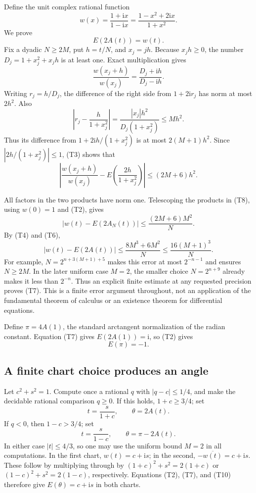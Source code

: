 Define the unit complex rational function
\[
 w(x)=\frac{1+\mathrm ix}{1-\mathrm ix}
     =\frac{1-x^2+2\mathrm ix}{1+x^2}.
\]
We prove
\[
                     E(2A(t))=w(t).                        \tag{T7}
\]
Fix a dyadic $N\geq2M$, put $h=t/N$, and $x_j=jh$.
Because $x_jh\geq0$, the number
$D_j=1+x_j^2+x_jh$ is at least one.  Exact multiplication gives
\[
 \frac{w(x_j+h)}{w(x_j)}
       =\frac{D_j+\mathrm ih}{D_j-\mathrm ih}.
\]
Writing $r_j=h/D_j$, the difference of the right side from
$1+2\mathrm ir_j$ has norm at most $2h^2$.
Also
\[
 \left|r_j-\frac{h}{1+x_j^2}\right|
 =\frac{|x_j|h^2}{D_j(1+x_j^2)}\leq Mh^2.
\]
Thus its difference from $1+2\mathrm i h/(1+x_j^2)$ is at most
$2(M+1)h^2$.  Since $|2h/(1+x_j^2)|\leq1$, (T3) shows that
\[
 \left|\frac{w(x_j+h)}{w(x_j)}
       -E\!\left(\frac{2h}{1+x_j^2}\right)\right|
 \leq(2M+6)h^2.                                            \tag{T8}
\]

All factors in the two products have norm one.  Telescoping the products
in (T8), using $w(0)=1$ and (T2), gives
\[
 |w(t)-E(2A_N(t))|
 \leq \frac{(2M+6)M^2}{N}.
\]
By (T4) and (T6),
\[
 |w(t)-E(2A(t))|
 \leq\frac{8M^3+6M^2}{N}
 \leq\frac{16(M+1)^3}{N}.                                  \tag{T9}
\]
For example, $N=2^{n+3(M+1)+5}$ makes this error at most $2^{-n-1}$
and ensures $N\geq2M$.  In the later uniform case $M=2$, the smaller
choice $N=2^{n+9}$ already makes it less than $2^{-n}$.
Thus an explicit finite estimate at any requested precision proves (T7).
This is a finite error argument throughout, not an application of the
fundamental theorem of calculus or an existence theorem for differential
equations.

Define $\pi=4A(1)$, the standard arctangent normalization of the radian
constant.  Equation (T7) gives $E(2A(1))=\mathrm i$, so (T2) gives
\[
                           E(\pi)=-1.                       \tag{T10}
\]

\subsection{A finite chart choice produces an angle}

Let $c^2+s^2=1$.  Compute once a rational $q$ with
$|q-c|\leq1/4$, and make the decidable rational comparison $q\geq0$.
If this holds, $1+c\geq3/4$; set
\[
             t=\frac{s}{1+c},\qquad \theta=2A(t).
\]
If $q<0$, then $1-c>3/4$; set
\[
             t=\frac{s}{1-c},\qquad \theta=\pi-2A(t).
\]
In either case $|t|\leq4/3$, so one may use the uniform bound $M=2$
in all computations.  In the first chart, $w(t)=c+\mathrm is$; in the
second, $-\overline{w(t)}=c+\mathrm is$.  These follow by multiplying
through by $(1+c)^2+s^2=2(1+c)$ or
$(1-c)^2+s^2=2(1-c)$, respectively.  Equations (T2), (T7), and (T10)
therefore give $E(\theta)=c+\mathrm is$ in both charts.

